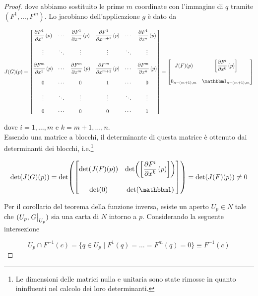 \begin{proof}
	dove abbiamo sostituito le prime $ m $ coordinate con l'immagine di $ q $ tramite $ (F^{1},\dots,F^{m}) $. Lo jacobiano dell'applicazione $ g $ è dato da
	
	\begin{equation}
		J(G)(p) = %
		\bmqty{ %
			\dpdv{F^{1}}{x^{1}} \, (p) & \cdots & \dpdv{F^{1}}{x^{m}} \, (p) & \dpdv{F^{1}}{x^{m+1}} \, (p) & \cdots & \dpdv{F^{1}}{x^{n}} \, (p) \\\\ %
			\vdots & \ddots & \vdots & \vdots & \ddots & \vdots \\\\ %
			\dpdv{F^{m}}{x^{1}} \, (p) & \cdots & \dpdv{F^{m}}{x^{m}} \, (p) & \dpdv{F^{m}}{x^{m+1}} \, (p) & \cdots & \dpdv{F^{m}}{x^{n}} \, (p) \\\\ %
			0 & \cdots & 0 & 1 & \cdots & 0 \\\\ %
			\vdots & \ddots & \vdots & \vdots & \ddots & \vdots \\\\ %
			0 & \cdots & 0 & 0 & \cdots & 1 %
		 } %
	 	= \bmqty{ %
	 		J(F)(p) & \left[ \dpdv{F^{i}}{x^{k}} \, (p) \right] \\\\ %
	 		0_{n-(m+1),m} & \bigone_{n-(m+1),m} %
	 		}
	\end{equation}

	dove $ i=1,\dots,m $ e $ k=m+1,\dots,n $.\\
	Essendo una matrice a blocchi, il determinante di questa matrice è ottenuto dai determinanti dei blocchi, i.e.\footnote{%
		Le dimensioni delle matrici nulla e unitaria sono state rimosse in quanto ininfluenti nel calcolo dei loro determinanti.%
	}
	
	\begin{equation}
		\det(J(G)(p)) = %
		\det ( \bmqty{ %
			\det( J(F)(p) ) & \det( \left[ \dpdv{F^{i}}{x^{k}} \, (p) \right] ) \\\\ %
			\det( 0 ) & \det( \bigone ) %
			} ) %
		= \det( J(F)(p) ) \neq 0
	\end{equation}

	Per il corollario del teorema della funzione inversa, esiste un aperto $ U_{p} \in N $ tale che $ (U_{p},\eval{G}_{U_{p}}) $ sia una carta di $ N $ intorno a $ p $. Considerando la seguente intersezione
	
	\begin{equation}
		U_{p} \cap F^{-1}(c) = \{ q \in U_{p} \mid F^{1}(q) = \dots = F^{m}(q) = 0 \} \equiv F^{-1}(c)
	\end{equation}


\end{proof}
